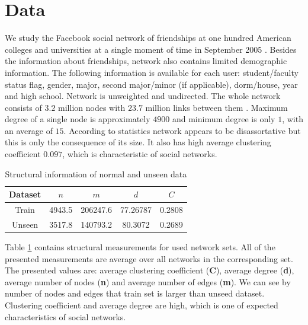 \documentclass[9pt,twocolumn,twoside]{pnas-new}
\begin{document}
\section*{Data}

We study the Facebook social network of friendships at one hundred American colleges and universities at a single moment of time in September 2005 \cite{facebook100, facebook5}. Besides the information about friendships, network also contains limited demographic information. The following information is available for each user: student/faculty status flag, gender, major, second major/minor (if applicable), dorm/house, year and high school. Network is unweighted and undirected. The whole network consists of $3.2$ million nodes with $23.7$ million links between them  \cite{facebook100statistics}. Maximum degree of a single node is approximately $4900$ and minimum degree is only $1$, with an average of $15$. According to statistics network appears to be disassortative but this is only the consequence of its size. It also has high average clustering coefficient $0.097$, which is characteristic of social networks.

\begin{table}[h!]
\centering
\begin{tabular}{ccccc}
Dataset & $n$ & $m$ & $d$ &  $C$ \\
\midrule
Train  & 4943.5 & 206247.6 & 77.26787 & 0.2808 \\
Unseen & 3517.8 & 140793.2 & 80.3072 & 0.2689 \\
\bottomrule
\end{tabular}
    \caption{Structural information of normal and unseen data}
\label{table:struct}
\end{table}

Table \ref{table:struct} contains structural measurements for used network sets. All of the presented measurements are average over all networks in the corresponding set. The presented values are: average clustering coefficient (\textbf{C}), average degree (\textbf{d}), average number of nodes (\textbf{n}) and average number of edges (\textbf{m}). We can see by number of nodes and edges that train set is larger than unseed dataset. Clustering coefficient and average degree are high, which is one of expected characteristics of social networks.
\end{document}
